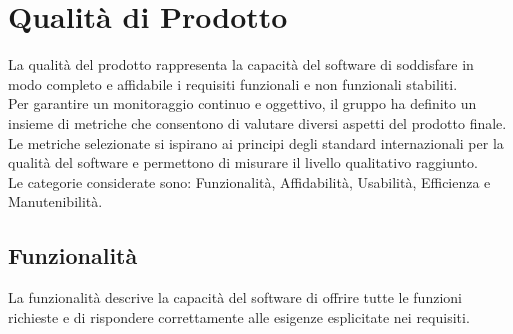 \section{Qualità di Prodotto}
La qualità del prodotto rappresenta la capacità del software di soddisfare in modo completo e affidabile i requisiti funzionali e non funzionali stabiliti.\\
Per garantire un monitoraggio continuo e oggettivo, il gruppo ha definito un insieme di metriche che consentono di valutare diversi aspetti del prodotto finale. Le metriche selezionate si ispirano ai principi degli standard internazionali per la qualità del software e permettono di misurare il livello qualitativo raggiunto.\\
Le categorie considerate sono: Funzionalità, Affidabilità, Usabilità, Efficienza e Manutenibilità.

\subsection{Funzionalità}
La funzionalità descrive la capacità del software di offrire tutte le funzioni richieste e di rispondere correttamente alle esigenze esplicitate nei requisiti. 
\begin{table}[h]
    \centering
    \renewcommand{\arraystretch}{1.15}
    \vspace{-0.3cm}
    \caption{Funzionalità del prodotto}
\end{table}

